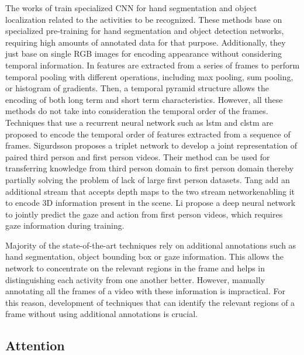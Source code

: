 \documentclass[10pt,twocolumn,letterpaper]{article}
\begin{document}
The works of \cite{ma2016deeper, singh2016first, zhou2016cascaded} train specialized CNN for hand segmentation and object localization related to the activities to be recognized. These methods base on specialized pre-training for hand segmentation and object detection networks, requiring high amounts of annotated data for that purpose. Additionally, they just base on single RGB images for encoding appearance without considering temporal information. In \cite{ryoo2015pooled, zaki2017modeling} features are extracted from a series of frames to perform temporal pooling with different operations, including max pooling, sum pooling, or histogram of gradients. Then, a temporal pyramid structure allows the encoding of both long term and short term characteristics. However, all these methods do not take into consideration the temporal order of the frames. Techniques that use a recurrent neural network such as \acf{lstm} \cite{cao2017egocentric, verma2018making} and \acf{clstm} \cite{sudhakaran2017convolutional, sudhakaran2018attention} are proposed to encode the temporal order of features extracted from a sequence of frames. Sigurdsson \etal \cite{sigurdsson2018actor} proposes a triplet network to develop a joint representation of paired third person and first person videos. Their method can be used for transferring knowledge from third person domain to first person domain thereby partially solving the problem of lack of large first person datasets. Tang \etal \cite{tang2017action, tang2018multi} add an additional stream that accepts depth maps to the two stream networkenabling it
to encode 3D information present in the scene. Li \etal \cite{li2018eye} propose a deep neural network to jointly predict the gaze and action from first person videos, which requires gaze information during training. 

Majority of the state-of-the-art techniques rely on additional annotations such as hand segmentation, object bounding box or gaze information. This allows the network to concentrate on the relevant regions in the frame and helps in distinguishing each activity from one another better. However, manually annotating all the frames of a video with these information is impractical. For this reason, development of techniques that can identify the relevant regions of a frame without using additional annotations is crucial.


\subsection{Attention}
\end{document}

